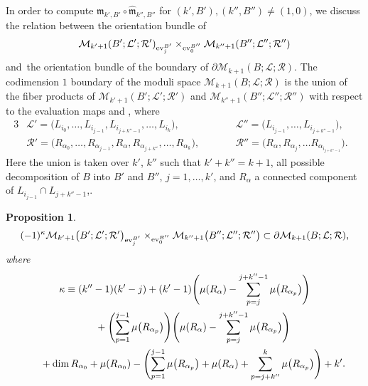 \documentclass[pdftex]{sigma}
\numberwithin{equation}{section}
\newtheorem{prop}[thm]{Proposition}
\theoremstyle{definition}
\begin{document}
In order to compute ${\mathfrak m}_{k',B'} \circ \hat{\mathfrak m}_{k'', B''}$ for $(k',B'), (k'',B'') \neq (1,0)$,
we discuss the relation between the orientation bundle of
\[
{\mathcal M}_{k'+1}(B';{\mathcal L}';{\mathcal R}')_{{\rm ev}_j^{B'}} \times_{{\rm ev}_0^{B''}} {\mathcal M}_{k''+1}(B'';{\mathcal L}'';{\mathcal R}'')
 \]
 and~the orientation bundle of the boundary of $\partial {\mathcal M}_{k+1}(B;{\mathcal L}; {\mathcal R})$.
 The codimension $1$ boundary of the moduli space ${\mathcal M}_{k+1}(B;{\mathcal L}; {\mathcal R})$ is
the union of the fiber products of
${\mathcal M}_{k'+1}(B';{\mathcal L}';{\mathcal R}')$ and ${\mathcal M}_{k''+1}(B'';{\mathcal L}'';{\mathcal R}'')$ with respect to
the evaluation maps
 and
,
where
\begin{alignat*}{3}
&{\mathcal L}'=\bigl(L_{i_0}, \dots, L_{i_{j-1}}, L_{i_{j+k''-1}}, \dots, L_{i_k}\bigr),\qquad&& {\mathcal L}''=\bigl(L_{i_{j-1}}, \dots, L_{i_{j+k''-1}}\bigr),& \\
&{\mathcal R}'=\bigl(R_{\alpha_0}, \dots , R_{\alpha_{j-1}}, R_{\alpha}, R_{\alpha_{j+k''}}, \dots, R_{\alpha_k}\bigr),\qquad&& {\mathcal R}''=\bigl(R_{\alpha}, R_{\alpha_{j}}, \dots R_{\alpha_{i_{j+k''-1}}}\bigr).&
\end{alignat*}
Here the union is taken over $k'$, $k''$ such that $k' + k'' = k+1$, all possible decomposition of $B$ into $B'$ and $B''$, $j=1, \dots, k'$, and
$R_{\alpha}$ a connected component of $L_{i_{j-1}} \cap L_{j+k''-1}$,.

 \begin{prop} \label{bdryori}
\begin{equation*}
(-1)^{\kappa} {\mathcal M}_{k'+1}\bigl(B';{\mathcal L}';{\mathcal R}'\bigr)_{{\rm ev}_j^{B'}} \times_{{\rm ev}_0^{B''}} {\mathcal M}_{k''+1}\bigl(B'';{\mathcal L}'';{\mathcal R}''\bigr)
\subset \partial {\mathcal M}_{k+1}(B;{\mathcal L}; {\mathcal R}),
\end{equation*}
where
\begin{gather*}
\kappa \equiv  (k''-1) (k'-j) +(k'-1) \Biggl( \mu(R_{\alpha}) - \sum_{p=j}^{j+k''-1} \mu\bigl(R_{\alpha_p}\bigr) \Biggr)  \\ \hphantom{\kappa\equiv}{}
  + \Biggl( \sum_{p=1}^{j-1}\mu\bigl(R_{\alpha_p}\bigr) \Biggr)
\Biggl(\mu(R_{\alpha}) - \sum_{p=j}^{j+k''-1} \mu\bigl(R_{\alpha_p}\bigr) \Biggr)
 \\ \hphantom{\kappa\equiv}{}
  + \dim R_{\alpha_0} + \mu(R_{\alpha_0}) - \Biggl( \sum_{p=1}^{j-1} \mu\bigl(R_{\alpha_p}\bigr) + \mu(R_{\alpha}) + \sum_{p=j+k''}^k \mu \bigl(R_{\alpha_p}\bigr) \Biggr) +k'.
\end{gather*}
\end{prop}
\end{document}
